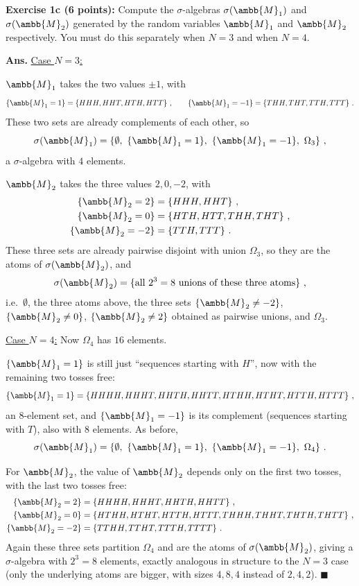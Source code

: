 \documentclass[12pt]{article} %
\newcommand{\mM}{\ambb{M}}
\newcommand{\Ans}{\textbf{Ans. }}
\begin{document}
\textbf{Exercise 1c (6 points):} Compute the $\sigma$-algebras
$\sigma(\mM_1)$ and $\sigma(\mM_2)$ generated by the random variables
$\mM_1$ and $\mM_2$ respectively. You must do this separately when
$N = 3$ and when $N = 4$.

\Ans \underline{Case $N=3$:}

$\mM_1$ takes the two values $\pm 1$, with
\begin{equation}
  \{\mM_1 = 1\} = \{HHH,HHT,HTH,HTT\}\ ,\qquad \{\mM_1 = -1\} = \{THH,THT,TTH,TTT\}\ .
\end{equation}
These two sets are already complements of each other, so
\begin{equation}
  \sigma(\mM_1) = \{\emptyset,\ \{\mM_1=1\},\ \{\mM_1=-1\},\ \Omega_3\}\ ,
\end{equation}
a $\sigma$-algebra with $4$ elements.

$\mM_2$ takes the three values $2,0,-2$, with
\begin{align}
  \{\mM_2=2\} &= \{HHH,HHT\}\ ,\\
  \{\mM_2=0\} &= \{HTH,HTT,THH,THT\}\ ,\\
  \{\mM_2=-2\} &= \{TTH,TTT\}\ .
\end{align}
These three sets are already pairwise disjoint with union $\Omega_3$,
so they are the atoms of $\sigma(\mM_2)$, and
\begin{equation}
  \sigma(\mM_2) = \{\text{all } 2^3 = 8 \text{ unions of these three atoms}\}\ ,
\end{equation}
i.e.\ $\emptyset$, the three atoms above, the three sets $\{\mM_2 \neq
-2\}$, $\{\mM_2\neq 0\}$, $\{\mM_2 \neq 2\}$ obtained as pairwise
unions, and $\Omega_3$.

\underline{Case $N=4$:} Now $\Omega_4$ has $16$ elements.

$\{\mM_1=1\}$ is still just ``sequences starting with $H$'', now with
the remaining two tosses free:
\begin{equation}
  \{\mM_1=1\} = \{HHHH,HHHT,HHTH,HHTT,HTHH,HTHT,HTTH,HTTT\}\ ,
\end{equation}
an $8$-element set, and $\{\mM_1=-1\}$ is its complement (sequences
starting with $T$), also with $8$ elements. As before,
\begin{equation}
  \sigma(\mM_1) = \{\emptyset,\ \{\mM_1=1\},\ \{\mM_1=-1\},\ \Omega_4\}\ .
\end{equation}

For $\mM_2$, the value of $\mM_2$ depends only on the first two
tosses, with the last two tosses free:
\begin{align}
  \{\mM_2=2\} &= \{HHHH,HHHT,HHTH,HHTT\}\ ,\\
  \{\mM_2=0\} &= \{HTHH,HTHT,HTTH,HTTT,THHH,THHT,THTH,THTT\}\ ,\\
  \{\mM_2=-2\} &= \{TTHH,TTHT,TTTH,TTTT\}\ .
\end{align}
Again these three sets partition $\Omega_4$ and are the atoms of
$\sigma(\mM_2)$, giving a $\sigma$-algebra with $2^3=8$ elements,
exactly analogous in structure to the $N=3$ case (only the underlying
atoms are bigger, with sizes $4,8,4$ instead of $2,4,2$).
\hfill$\blacksquare$
\end{document}
